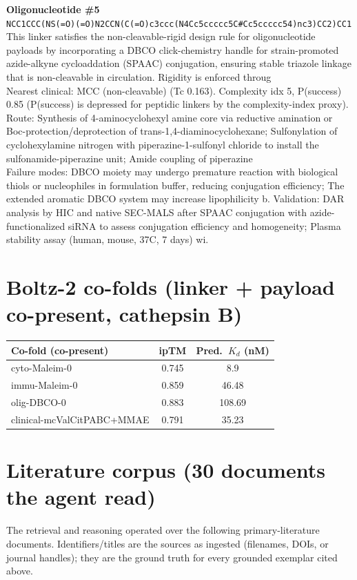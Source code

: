 \documentclass[10pt]{article}
\begin{document}
\noindent\textbf{Oligonucleotide \#5} \\ \texttt{NCC1CCC(NS(=O)(=O)N2CCN(C(=O)c3ccc(N4Cc5ccccc5C\#Cc5ccccc54)nc3)CC2)CC1} \\ This linker satisfies the non-cleavable-rigid design rule for oligonucleotide payloads by incorporating a DBCO click-chemistry handle for strain-promoted azide-alkyne cycloaddation (SPAAC) conjugation, ensuring stable triazole linkage that is non-cleavable in circulation. Rigidity is enforced throug \\ Nearest clinical: MCC (non-cleavable) (Tc 0.163). Complexity idx 5, P(success) 0.85 (P(success) is depressed for peptidic linkers by the complexity-index proxy). \\ Route: Synthesis of 4-aminocyclohexyl amine core via reductive amination or Boc-protection/deprotection of trans-1,4-diaminocyclohexane; Sulfonylation of cyclohexylamine nitrogen with piperazine-1-sulfonyl chloride to install the sulfonamide-piperazine unit; Amide coupling of piperazine \\ Failure modes: DBCO moiety may undergo premature reaction with biological thiols or nucleophiles in formulation buffer, reducing conjugation efficiency; The extended aromatic DBCO system may increase lipophilicity b. Validation: DAR analysis by HIC and native SEC-MALS after SPAAC conjugation with azide-functionalized siRNA to assess conjugation efficiency and homogeneity; Plasma stability assay (human, mouse, 37\textdegree{}C, 7 days) wi. \\[0.4em]
\section{Boltz-2 co-folds (linker + payload co-present, cathepsin B)}
\begin{table}[h]\centering\small\begin{tabular}{l c c}\toprule Co-fold (co-present) & ipTM & Pred.\ $K_d$ (nM) \\ \midrule cyto-Maleim-0 & 0.745 & 8.9 \\
immu-Maleim-0 & 0.859 & 46.48 \\
olig-DBCO-0 & 0.883 & 108.69 \\
clinical-mcValCitPABC+MMAE & 0.791 & 35.23 \\ \bottomrule\end{tabular}\end{table}
\section{Literature corpus (30 documents the agent read)}
The retrieval and reasoning operated over the following primary-literature documents. Identifiers/titles are the sources as ingested (filenames, DOIs, or journal handles); they are the ground truth for every grounded exemplar cited above.
\end{document}
